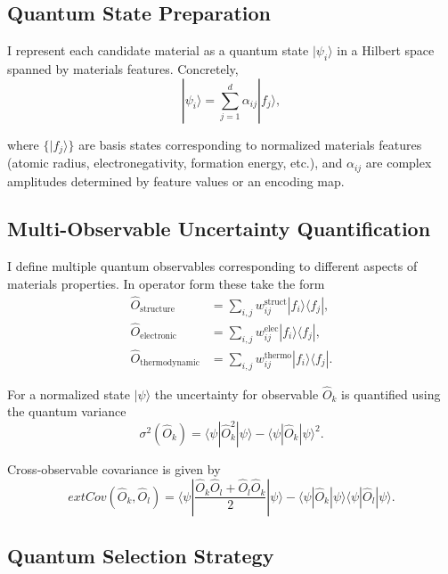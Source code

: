 \documentclass{article}
\begin{document}
\subsection{Quantum State Preparation}

I represent each candidate material as a quantum state $|\psi_i\rangle$ in a Hilbert space spanned by materials features. Concretely,
\begin{equation}
|\psi_i\rangle = \sum_{j=1}^{d} \alpha_{ij} |f_j\rangle,
\end{equation}

where $\{|f_j\rangle\}$ are basis states corresponding to normalized materials features (atomic radius, electronegativity, formation energy, etc.), and $\alpha_{ij}$ are complex amplitudes determined by feature values or an encoding map.

\subsection{Multi-Observable Uncertainty Quantification}

I define multiple quantum observables corresponding to different aspects of materials properties. In operator form these take the form
\begin{align}
\hat{O}_{\text{structure}} &= \sum_{i,j} w_{ij}^{\text{struct}} |f_i\rangle\langle f_j|, \\
\hat{O}_{\text{electronic}} &= \sum_{i,j} w_{ij}^{\text{elec}} |f_i\rangle\langle f_j|, \\
\hat{O}_{\text{thermodynamic}} &= \sum_{i,j} w_{ij}^{\text{thermo}} |f_i\rangle\langle f_j|.
\end{align}

For a normalized state $|\psi\rangle$ the uncertainty for observable $\hat{O}_k$ is quantified using the quantum variance
\begin{equation}
\sigma^2(\hat{O}_k) = \langle\psi|\hat{O}_k^2|\psi\rangle - \langle\psi|\hat{O}_k|\psi\rangle^2.
\end{equation}

Cross-observable covariance is given by
\begin{equation}
    	ext{Cov}(\hat{O}_k,\hat{O}_l) = \langle\psi|\frac{\hat{O}_k\hat{O}_l + \hat{O}_l\hat{O}_k}{2}|\psi\rangle - \langle\psi|\hat{O}_k|\psi\rangle\langle\psi|\hat{O}_l|\psi\rangle.
\end{equation}

\subsection{Quantum Selection Strategy}
\end{document}
